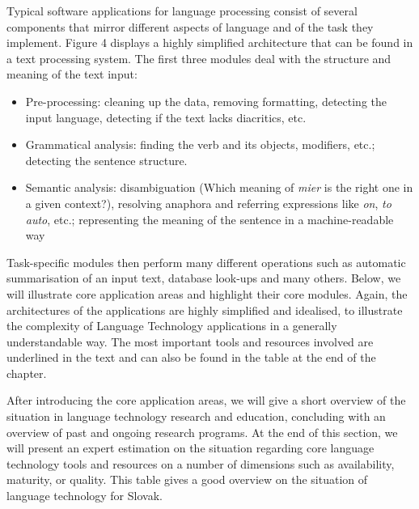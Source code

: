 
Typical software applications for language processing consist of several components that mirror different aspects of language and of the task they implement. Figure 4 displays a highly simplified architecture that can be found in a text processing system. The first three modules deal with the structure and meaning of the text input:

\begin{itemize}%
\item Pre-processing: cleaning up the data, removing formatting, detecting the input language, detecting if the text lacks diacritics, etc.
\item Grammatical analysis: finding the verb and its objects, modifiers, etc.;  detecting the sentence structure.
\item Semantic analysis: disambiguation (Which meaning of \emph{mier} is the right one in a given context?), resolving anaphora and referring expressions like \emph{on}, \emph{to auto}, etc.; representing the meaning of the sentence in a machine-readable way
\end{itemize}

Task-specific modules then perform many different operations such as automatic summarisation of an input text, database look-ups and many others. Below, we will illustrate core application areas and highlight their core modules. Again, the architectures of the applications are highly simplified and idealised, to illustrate the complexity of Language Technology applications in a generally understandable way. The most important tools and resources involved are underlined in the text and can also be found in the table at the end of the chapter. 

After introducing the core application areas, we will give a short overview of the situation in language technology research and education, concluding with an overview of past and ongoing research programs. At the end of this section, we will present an expert estimation on the situation regarding core language technology tools and resources on a number of dimensions such as availability, maturity, or quality. This table gives a good overview on the situation of language technology for Slovak.
